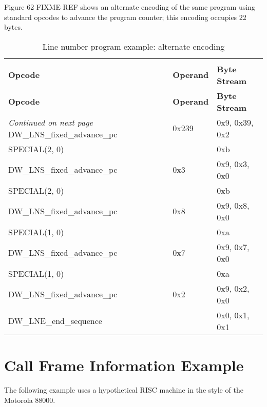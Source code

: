 Figure 62  FIXME REF
shows an alternate 
encoding of the same program using 
standard opcodes to advance
the program counter; 
this encoding occupies 22 bytes.

\begin{centering}
\setlength{\extrarowheight}{0.1cm}
\begin{longtable}{lll}
  \caption{Line number program example: alternate encoding} \label{tab:linenumberprogramexamplealternateencoding} \\
  \hline \\ \bfseries Opcode &\bfseries Operand &\bfseries Byte Stream \\ \hline
\endfirsthead
  \bfseries Opcode &\bfseries Operand &\bfseries Byte Stream\\ \hline
\endhead
  \hline \emph{Continued on next page}
\endfoot
  \hline
\endlastfoot
DW\_LNS\_fixed\_advance\_pc&0x239&0x9, 0x39, 0x2        \\
SPECIAL(2, 0)&& 0xb        \\
DW\_LNS\_fixed\_advance\_pc&0x3&0x9, 0x3, 0x0        \\
SPECIAL(2, 0)&&0xb        \\
DW\_LNS\_fixed\_advance\_pc&0x8&0x9, 0x8, 0x0        \\
SPECIAL(1, 0)&& 0xa        \\
DW\_LNS\_fixed\_advance\_pc&0x7&0x9, 0x7, 0x0        \\
SPECIAL(1, 0) && 0xa        \\
DW\_LNS\_fixed\_advance\_pc&0x2&0x9, 0x2, 0x0        \\
DW\_LNE\_end\_sequence&&0x0, 0x1, 0x1        \\
\end{longtable}
\end{centering}


\section{Call Frame Information Example}
\label{app:callframeinformationexample}

The following example uses a hypothetical RISC machine in
the style of the Motorola 88000.

